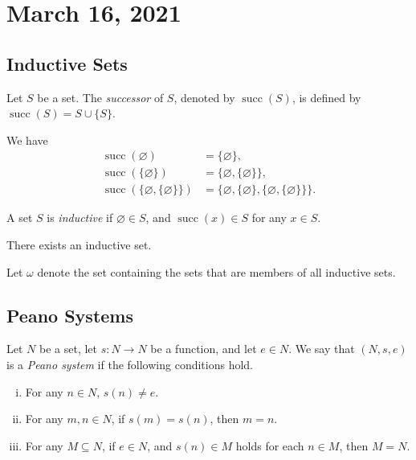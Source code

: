 \documentclass[11pt]{article}
\DeclareMathOperator{\suc}{succ}
\begin{document}
\section{March 16, 2021}
\subsection{Inductive Sets}
\begin{definition}
  Let $S$ be a set.
  The \emph{successor} of $S$, denoted by $\suc(S)$, is defined by $\suc(S) = S \cup \{S\}$.
\end{definition}

\begin{example}
  We have
  \begin{align*}
    \suc(\varnothing) &= \{\varnothing\}, \\
    \suc(\{\varnothing\}) &= \{\varnothing, \{\varnothing\}\}, \\
    \suc(\{\varnothing, \{\varnothing\}\}) &= \{\varnothing, \{\varnothing\}, \{\varnothing, \{\varnothing\}\}\}.
  \end{align*}
\end{example}

\begin{definition}
  A set $S$ is \emph{inductive} if $\varnothing \in S$, and $\suc(x) \in S$ for any $x \in S$.
\end{definition}

\begin{axiom}[Infinity]
  There exists an inductive set.
\end{axiom}

\begin{definition}
  Let $\omega$ denote the set containing the sets that are members of all inductive sets.
\end{definition}

\subsection{Peano Systems}
\begin{definition}
  \label{def:peano}
  Let $N$ be a set, let $s: N \to N$ be a function, and let $e \in N$.
  We say that $(N, s, e)$ is a \emph{Peano system} if the following conditions hold.
  \begin{enumerate}[(i)]
    \item For any $n \in N$, $s(n) \neq e$.
    \item For any $m, n \in N$, if $s(m) = s(n)$, then $m = n$.
    \item For any $M \subseteq N$, if $e \in N$, and $s(n) \in M$ holds for each $n \in M$, then $M = N$.
  \end{enumerate}
\end{definition}
\end{document}

